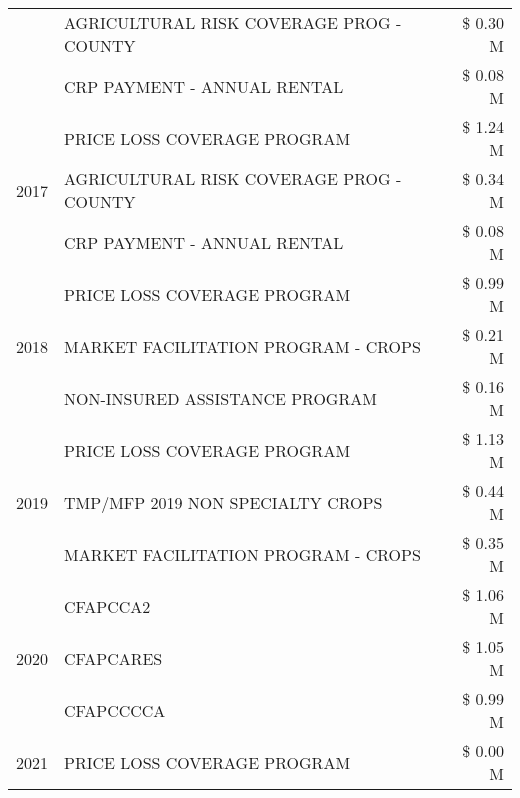 \begin{tabular}{llr}
 & AGRICULTURAL RISK COVERAGE PROG - COUNTY & \$ 0.30 M \\
 & CRP PAYMENT - ANNUAL RENTAL & \$ 0.08 M \\
\cline{1-3}
\multirow[t]{3}{*}{2017} & PRICE LOSS COVERAGE PROGRAM & \$ 1.24 M \\
 & AGRICULTURAL RISK COVERAGE PROG - COUNTY & \$ 0.34 M \\
 & CRP PAYMENT - ANNUAL RENTAL & \$ 0.08 M \\
\cline{1-3}
\multirow[t]{3}{*}{2018} & PRICE LOSS COVERAGE PROGRAM & \$ 0.99 M \\
 & MARKET FACILITATION PROGRAM - CROPS & \$ 0.21 M \\
 & NON-INSURED ASSISTANCE PROGRAM & \$ 0.16 M \\
\cline{1-3}
\multirow[t]{3}{*}{2019} & PRICE LOSS COVERAGE PROGRAM & \$ 1.13 M \\
 & TMP/MFP 2019 NON SPECIALTY CROPS & \$ 0.44 M \\
 & MARKET FACILITATION PROGRAM - CROPS & \$ 0.35 M \\
\cline{1-3}
\multirow[t]{3}{*}{2020} & CFAPCCA2 & \$ 1.06 M \\
 & CFAPCARES & \$ 1.05 M \\
 & CFAPCCCCA & \$ 0.99 M \\
\cline{1-3}
2021 & PRICE LOSS COVERAGE PROGRAM & \$ 0.00 M \\
\cline{1-3}
\bottomrule
\end{tabular}
